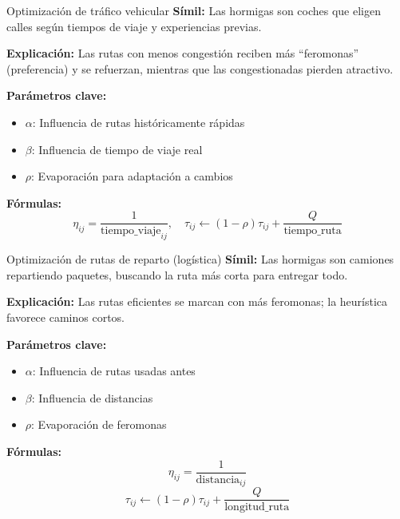\documentclass{beamer}
\begin{document}
\begin{frame}{Optimización de tráfico vehicular}
\textbf{Símil:} Las hormigas son coches que eligen calles según tiempos de viaje y experiencias previas.

\medskip
\textbf{Explicación:} Las rutas con menos congestión reciben más “feromonas” (preferencia) y se refuerzan, mientras que las congestionadas pierden atractivo.

\medskip
\textbf{Parámetros clave:}
\begin{itemize}[noitemsep]
    \item $\alpha$: Influencia de rutas históricamente rápidas
    \item $\beta$: Influencia de tiempo de viaje real
    \item $\rho$: Evaporación para adaptación a cambios
\end{itemize}

\medskip
\textbf{Fórmulas:}
\[
\eta_{ij} = \frac{1}{\text{tiempo\_viaje}_{ij}}, \quad
\tau_{ij} \leftarrow (1-\rho)\tau_{ij} + \frac{Q}{\text{tiempo\_ruta}}
\]
\end{frame}

\begin{frame}{Optimización de rutas de reparto (logística)}
\textbf{Símil:} Las hormigas son camiones repartiendo paquetes, buscando la ruta más corta para entregar todo.

\medskip
\textbf{Explicación:} Las rutas eficientes se marcan con más feromonas; la heurística favorece caminos cortos.

\medskip
\textbf{Parámetros clave:}
\begin{itemize}[noitemsep]
    \item $\alpha$: Influencia de rutas usadas antes
    \item $\beta$: Influencia de distancias
    \item $\rho$: Evaporación de feromonas
\end{itemize}

\medskip
\textbf{Fórmulas:}
\[
\eta_{ij} = \frac{1}{\text{distancia}_{ij}}
\]
\[
\tau_{ij} \leftarrow (1-\rho)\tau_{ij} + \frac{Q}{\text{longitud\_ruta}}
\]
\end{frame}
\end{document}
